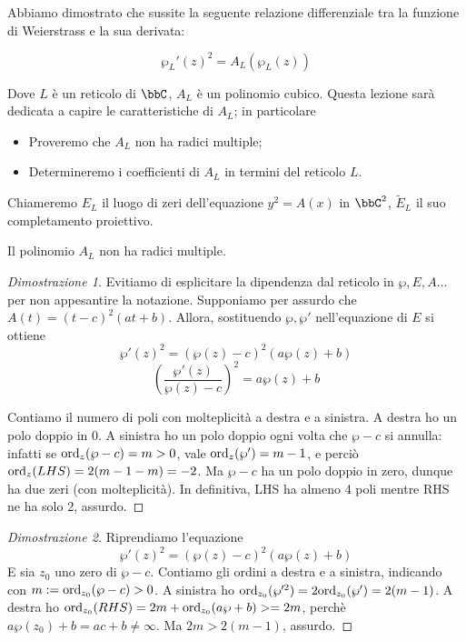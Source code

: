
Abbiamo dimostrato che sussite la seguente relazione differenziale tra la funzione di Weierstrass e la sua derivata:

$$\wp_L'(z)^2 = A_L(\wp_L(z)) $$

Dove $L$ è un reticolo di $\bbC$,  $A_L$ è un polinomio cubico. Questa lezione sarà dedicata a capire le caratteristiche di $A_L$; in particolare
\begin{itemize}
\item Proveremo che $A_L$ non ha radici multiple;
\item Determineremo i coefficienti di $A_L$ in termini del reticolo $L$.
\end{itemize}

Chiameremo $E_L$ il luogo di zeri dell'equazione $y^2=A(x)$ in $\bbC^2$, $\tilde{E}_L$ il suo completamento proiettivo.
\begin{proposizione}
Il polinomio $A_L$ non ha radici multiple.
\end{proposizione}

\begin{proof}[Dimostrazione 1]
Evitiamo di esplicitare la dipendenza dal reticolo in $\wp, E,A \dots$ per non appesantire la notazione. Supponiamo per assurdo che $A(t) = (t-c)^2(at+b)$. Allora, sostituendo $\wp, \wp'$ nell'equazione di $E$ si ottiene
$$\wp'(z)^2 = (\wp(z) - c)^2(a\wp(z)+b) $$
$$ \left ( \frac{\wp'(z)}{\wp(z)-c} \right )^2 = a\wp(z)+b $$

Contiamo il numero di poli con molteplicità a destra e a sinistra. A destra ho un polo doppio in $0$. A sinistra ho un polo doppio ogni volta che $\wp - c$ si annulla: infatti se $\text{ord}_{z}(\wp -c) = m > 0$, vale $\text{ord}_{z}(\wp') = m-1$, e perciò $\text{ord}_{z}(LHS) = 2(m-1-m) = -2$. Ma $\wp-c$ ha un polo doppio in zero, dunque ha due zeri (con molteplicità). In definitiva, LHS ha almeno 4 poli mentre RHS ne ha solo 2, assurdo.
\end{proof}

\begin{proof}[Dimostrazione 2]
Riprendiamo l'equazione 
$$\wp'(z)^2 = (\wp(z) - c)^2(a\wp(z)+b) $$
E sia $z_0$ uno zero di $\wp-c$. Contiamo gli ordini a destra e a sinistra, indicando con $m:=\text{ord}_{z_0}(\wp-c) > 0$. 
A sinistra ho $\text{ord}_{z_0}( \wp'^2) = 2\text{ord}_{z_0}( \wp') = 2(m-1)$. A destra ho $\text{ord}_{z_0}(RHS) = 2m + \text{ord}_{z_0}(a\wp+b) >= 2m$, perchè $a \wp(z_0)+b = ac+b \neq \infty$. Ma $2m> 2(m-1)$, assurdo.
\end{proof}


